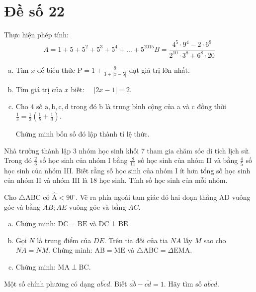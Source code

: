 \onehalfspacing
\section{Đề số 22}
\graphicspath{{./img/}}
\begin{bt} 
    Thực hiện phép tính:
    $$
    A=1+5+5^2+5^3+5^4+\ldots+5^{2015} B=\frac{4^5 \cdot 9^4-2 \cdot 6^9}{2^{10} \cdot 3^8+6^8 \cdot 20}
    $$
\loigiai{}
\end{bt}

\begin{bt}
    \hfill
	\begin{enumerate}[a.]
        \item Tìm $x$ để biểu thức $\mathrm{P}=1+\frac{9}{3+|x-5|}$ đạt giá trị lớn nhất.
        \item Tìm giá trị của $x$ biết: $\quad|2 x-1|=2$.
        \item Cho 4 số $\mathrm{a}, \mathrm{b}, \mathrm{c}, \mathrm{d}$ trong đó $\mathrm{b}$ là trung bình cộng của a và $\mathrm{c}$ đồng thời $\frac{1}{c}=\frac{1}{2}\left(\frac{1}{b}+\frac{1}{d}\right)$.
        
        Chứng minh bốn số đó lập thành tỉ lệ thức.
    \end{enumerate}
	\loigiai{} 
\end{bt}

\begin{bt}
    Nhà trường thành lập 3 nhóm học sinh khối 7 tham gia chăm sóc di tích lịch sử. Trong đó $\frac{2}{3}$ số học sinh của nhóm I bằng $\frac{8}{11}$ số học sinh của nhóm II và bằng $\frac{4}{5}$ số học sinh của nhóm III. Biết rằng số học sinh của nhóm I ít hơn tổng số học sinh của nhóm II và nhóm III là 18 học sinh. Tính số học sinh của mỗi nhóm.
	\loigiai{}
\end{bt}

\begin{bt}
    Cho $\triangle \mathrm{ABC}$ có $\hat{\mathrm{A}}<90^{\circ}$. Vẽ ra phía ngoài tam giác đó hai đoạn thẳng $\mathrm{AD}$ vuông góc và bằng $A B ; A E$ vuông góc và bằng $A C$.
    \begin{enumerate}[a.]
        \item Chứng minh: $\mathrm{DC}=\mathrm{BE}$ và $\mathrm{DC} \perp \mathrm{BE}$
        \item Gọi $N$ là trung điểm của $DE$. Trên tia đối của tia $NA$ lấy $M$ sao cho $NA=NM$. Chứng minh: $\mathrm{AB}=\mathrm{ME}$ và $\triangle \mathrm{ABC}=\Delta \mathrm{EMA}$.
        \item Chứng minh: $\mathrm{MA} \perp \mathrm{BC}$.
    \end{enumerate}
\loigiai{}
\end{bt}

\begin{bt}
    Một số chính phương có dạng $\overline{a b c d}$. Biết $\overline{a b}-\overline{c d}=1$. Hãy tìm số $\overline{a b c d}$.
\loigiai{}
\end{bt}

